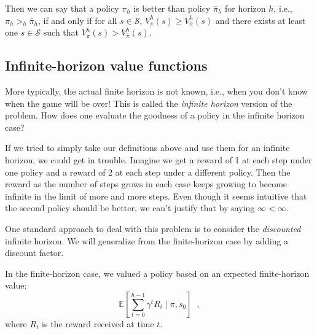 

Then we can say that a policy $\pi_h$ is better than policy $\bar{\pi}_h$ for horizon
$h$, i.e., $\pi_h >_h \bar{\pi}_h$, if and only if for all $s \in \mathcal S$,
$V_{\pi}^h(s) \geq V_{\bar{\pi}}^h(s)$ and there exists at least one $s
  \in \mathcal S$ such that $V_{\pi}^h(s) > V_{\bar{\pi}}^h(s)$.

\subsection{Infinite-horizon value functions}
\label{sec-mdp_infinite_horizon}
\label{sec-discount}

More typically, the actual finite horizon is not known, i.e., when you
don't know when the game will be over!  This is called the {\em
    infinite horizon} version of the problem.  How does one evaluate the
goodness of a policy in the infinite horizon case?

If we tried to simply take our definitions above and use them for an
infinite horizon, we could get in trouble. Imagine we get a reward of
1 at each step under one policy and a reward of 2 at each step under a
different policy. Then the reward as the number of steps grows in each
case keeps growing to become infinite in the limit of more and more
steps. Even though it seems intuitive that the second policy should
be better, we can't justify that by saying $\infty < \infty$.

One standard approach to deal with this problem is to consider the
\emph{discounted} infinite horizon.
We will generalize from the finite-horizon case by adding a discount factor.

In the finite-horizon case, we valued a
policy based on an expected finite-horizon value:
\begin{equation}
  \mathbb{E}\left[\sum_{t = 0}^{h-1} \gamma^t R_t \mid \pi, s_0\right]\;\;,
  \label{eq:exp_finite}
\end{equation}
where $R_t$ is the reward received at time $t$.

